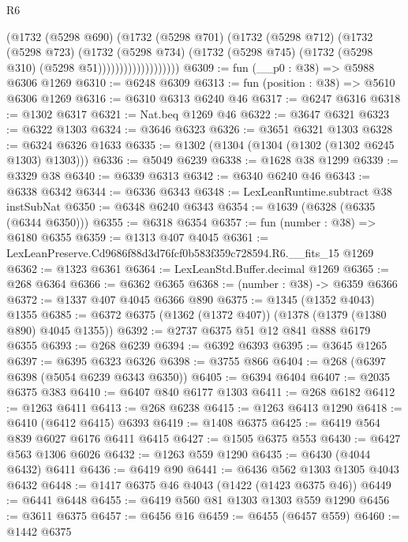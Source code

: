 \begin{lexlean}{R6}
\begin{coremodule}
                          (@1732
                            (@5298 @690)
                            (@1732
                              (@5298 @701)
                              (@1732
                                (@5298 @712)
                                (@1732
                                  (@5298 @723)
                                  (@1732
                                    (@5298 @734)
                                    (@1732
                                      (@5298 @745)
                                      (@1732 (@5298 @310) (@5298 @51)))))))))))))))))))
@6309 := fun (__p0 : @38) => @5988 @6306 @1269
@6310 := @6248 @6309
@6313 := fun (position : @38) => @5610 @6306 @1269
@6316 := @6310 @6313 @6240 @46
@6317 := @6247 @6316
@6318 := @1302 @6317
@6321 := Nat.beq @1269 @46
@6322 := @3647 @6321
@6323 := @6322 @1303
@6324 := @3646 @6323
@6326 := @3651 @6321 @1303
@6328 := @6324 @6326 @1633
@6335 := @1302 (@1304 (@1304 (@1302 (@1302 @6245 @1303) @1303)))
@6336 := @5049 @6239
@6338 := @1628 @38 @1299
@6339 := @3329 @38
@6340 := @6339 @6313
@6342 := @6340 @6240 @46
@6343 := @6338 @6342
@6344 := @6336 @6343
@6348 := LexLeanRuntime.subtract @38 instSubNat
@6350 := @6348 @6240 @6343
@6354 := @1639 (@6328 (@6335 (@6344 @6350)))
@6355 := @6318 @6354
@6357 := fun (number : @38) => @6180 @6355
@6359 := @1313 @407 @4045
@6361 := LexLeanPreserve.Cd9686f88d3d76fcf0b583f359c728594.R6.__fits_15 @1269
@6362 := @1323 @6361
@6364 := LexLeanStd.Buffer.decimal @1269
@6365 := @268 @6364
@6366 := @6362 @6365
@6368 := (number : @38) -> @6359 @6366
@6372 := @1337 @407 @4045 @6366 @890
@6375 := @1345 (@1352 @4043) @1355
@6385 := @6372 @6375 (@1362 (@1372 @407)) (@1378 (@1379 (@1380 @890) @4045 @1355))
@6392 := @2737 @6375 @51 @12 @841 @888 @6179 @6355
@6393 := @268 @6239
@6394 := @6392 @6393
@6395 := @3645 @1265
@6397 := @6395 @6323 @6326
@6398 := @3755 @866
@6404 := @268 (@6397 @6398 (@5054 @6239 @6343 @6350))
@6405 := @6394 @6404
@6407 := @2035 @6375 @383
@6410 := @6407 @840 @6177 @1303
@6411 := @268 @6182
@6412 := @1263 @6411
@6413 := @268 @6238
@6415 := @1263 @6413 @1290
@6418 := @6410 (@6412 @6415) @6393
@6419 := @1408 @6375
@6425 := @6419 @564 @839 @6027 @6176 @6411 @6415
@6427 := @1505 @6375 @553
@6430 := @6427 @563 @1306 @6026
@6432 := @1263 @559 @1290
@6435 := @6430 (@4044 @6432) @6411
@6436 := @6419 @90
@6441 := @6436 @562 @1303 @1305 @4043 @6432
@6448 := @1417 @6375 @46 @4043 (@1422 (@1423 @6375 @46))
@6449 := @6441 @6448
@6455 := @6419 @560 @81 @1303 @1303 @559 @1290
@6456 := @3611 @6375
@6457 := @6456 @16
@6459 := @6455 (@6457 @559)
@6460 := @1442 @6375

\end{coremodule}
\end{lexlean}

